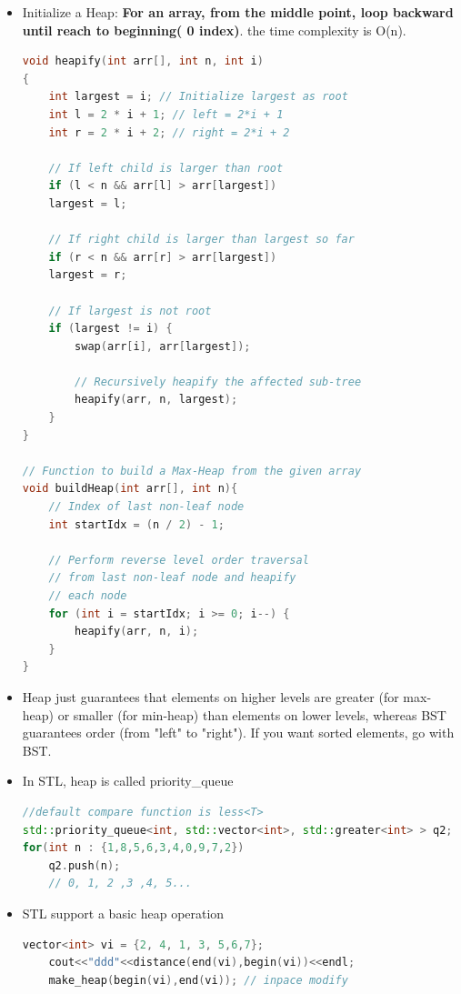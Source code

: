 \documentclass[a4paper,11pt,twoside]{book}
\begin{document}
\begin{itemize}
\item Initialize a Heap: \textbf{For an array, from the middle point, loop backward until reach to beginning( 0 index)}. the time complexity is O(n). 

\begin{lstlisting}[frame=single, language=c++]
void heapify(int arr[], int n, int i)
{
	int largest = i; // Initialize largest as root
	int l = 2 * i + 1; // left = 2*i + 1
	int r = 2 * i + 2; // right = 2*i + 2
	
	// If left child is larger than root
	if (l < n && arr[l] > arr[largest])
	largest = l;
	
	// If right child is larger than largest so far
	if (r < n && arr[r] > arr[largest])
	largest = r;
	
	// If largest is not root
	if (largest != i) {
		swap(arr[i], arr[largest]);
		
		// Recursively heapify the affected sub-tree
		heapify(arr, n, largest);
	}
}

// Function to build a Max-Heap from the given array
void buildHeap(int arr[], int n){
	// Index of last non-leaf node
	int startIdx = (n / 2) - 1;
	
	// Perform reverse level order traversal
	// from last non-leaf node and heapify
	// each node
	for (int i = startIdx; i >= 0; i--) {
		heapify(arr, n, i);
	}
}
\end{lstlisting}

\item Heap just guarantees that elements on higher levels are greater (for max-heap) or smaller (for min-heap) than elements on lower levels, whereas BST guarantees order (from "left" to "right"). If you want sorted elements, go with BST.

\item In STL, heap is called priority\_queue

\begin{lstlisting}[frame=single, language=c++, mathescape=true, basicstyle=\scriptsize]
//default compare function is less<T>
std::priority_queue<int, std::vector<int>, std::greater<int> > q2;
for(int n : {1,8,5,6,3,4,0,9,7,2})
	q2.push(n);
    // 0, 1, 2 ,3 ,4, 5...
\end{lstlisting}


\item STL support a basic heap operation

\begin{lstlisting}[frame=single, language=c++, mathescape=true]
	vector<int> vi = {2, 4, 1, 3, 5,6,7};
	cout<<"ddd"<<distance(end(vi),begin(vi))<<endl;
	make_heap(begin(vi),end(vi)); // inpace modify
	

\end{lstlisting}
\end{itemize}
\end{document}
